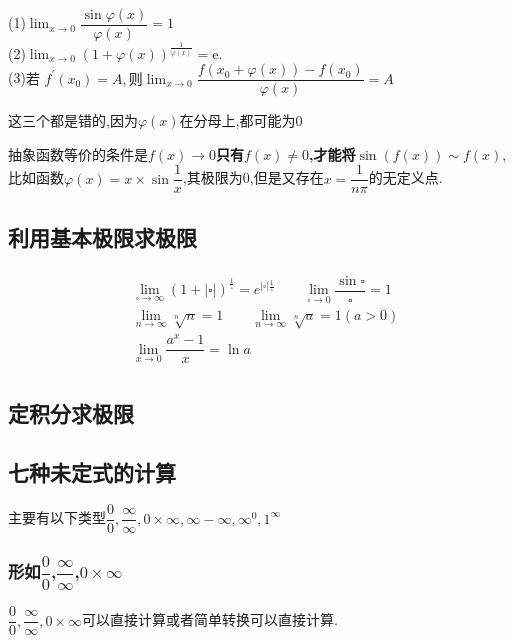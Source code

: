 \documentclass[12pt, a4paper, oneside, UTF8]{ctexbook}
\begin{document}
\begin{sloppypar}
\begin{problem}
        (1)$\lim_{x\to0}\dfrac{\sin\varphi(x)}{\varphi(x)}=1$\\
        (2)$\lim_{x\to0}(1+\varphi(x))^{\frac{1}{\varphi(x)}}=\mathrm{e}.$\\
        (3)$\text{若 }f^{\prime}(x_{0})=A,\text{则}\operatorname*{lim}_{x\to0}\dfrac{f(x_{0}+\varphi(x))-f(x_{0})}{\varphi(x)}=A$\\
    \end{problem}
    \begin{solution}
        这三个都是错的,因为$\varphi(x)$在分母上,都可能为0
    \end{solution}
    \begin{note}
        抽象函数等价的条件是\textbf{$f(x) \to 0$只有$f(x) \neq 0$,才能将$\sin(f(x))\sim f(x)$},比如函数$\varphi(x)=x\times\sin\dfrac{1}{x}$,其极限为0,但是又存在$x=\dfrac{1}{n\pi}$的无定义点.
    \end{note}
    \subsection{利用基本极限求极限}
    \begin{align*} \boxed
        {
            \begin{aligned}
                 & \lim_{\square \to \infty }(1+|\square|)^{\frac{1}{\square}}=e^{|\square| \frac{1}{\square}} \qquad     \lim _ { \square \rightarrow 0 } \dfrac { \sin \square } { \square } = 1 \\
                 & \lim_{n \to \infty }\sqrt[n]{n}=1 \qquad \lim_{n \to \infty} \sqrt[n]{a}=1(a>0)                                                                                                \\
                 & \lim_{x \to 0} \dfrac{a^x-1}{x}=\ln a
            \end{aligned}
        }
    \end{align*}
    \subsection{定积分求极限}
    \subsection{七种未定式的计算}
    主要有以下类型$\dfrac{0}{0},\dfrac{\infty}{\infty},0 \times \infty,\infty -\infty,\infty ^0,1^\infty$
    \subsubsection{形如$\dfrac{0}{0}$,$\dfrac{\infty}{\infty}$,$0 \times \infty$}
         $\dfrac{0}{0},\dfrac{\infty}{\infty},0 \times \infty$可以直接计算或者简单转换可以直接计算.

\end{sloppypar}
\end{document}
